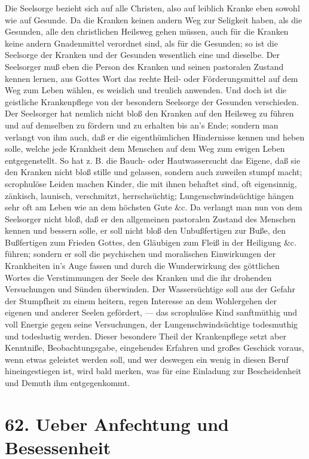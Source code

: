 Die Seelsorge bezieht sich auf alle Christen, also auf leiblich Kranke eben sowohl wie auf Gesunde. Da die Kranken keinen andern Weg zur Seligkeit haben, als die Gesunden, alle den christlichen Heilsweg gehen müssen, auch für die Kranken keine andern Gnadenmittel verordnet sind, als für die Gesunden; so ist die Seelsorge der Kranken und der Gesunden wesentlich eine und dieselbe. Der Seelsorger muß eben die Person des Kranken und seinen pastoralen Zustand kennen lernen, aus Gottes Wort das rechte Heil- oder Förderungsmittel auf dem Weg zum Leben wählen, es weislich und treulich anwenden. Und doch ist die geistliche Krankenpflege von der besondern Seelsorge der Gesunden verschieden. Der Seelsorger hat nemlich nicht bloß den Kranken auf den Heilsweg zu führen und auf demselben zu fördern und zu erhalten bis an’s Ende; sondern man verlangt von ihm auch, daß er die eigenthümlichen Hindernisse kennen und heben solle, welche jede Krankheit dem Menschen auf dem Weg zum ewigen Leben entgegenstellt. So hat z. B. die Bauch- oder Hautwassersucht das Eigene, daß sie den Kranken nicht bloß stille und gelassen, sondern auch zuweilen stumpf macht; scrophulöse Leiden machen Kinder, die mit ihnen behaftet sind, oft eigensinnig, zänkisch, launisch, verschmitzt, herrschsüchtig; Lungenschwindsüchtige hängen sehr oft am
Leben wie an dem höchsten Gute \&c. Da verlangt man nun von dem Seelsorger nicht bloß, daß er den allgemeinen pastoralen Zustand des Menschen kennen und bessern solle, er soll nicht bloß den Unbußfertigen zur Buße, den Bußfertigen zum Frieden Gottes, den Gläubigen zum Fleiß in der Heiligung \&c. führen; sondern er soll die psychischen und moralischen Einwirkungen der Krankheiten in’s Auge fassen und durch die Wunderwirkung des göttlichen Wortes die Verstimmungen der Seele des Kranken und die ihr drohenden Versuchungen und Sünden überwinden. Der Wassersüchtige soll aus der Gefahr der Stumpfheit zu einem heitern, regen Interesse an dem Wohlergehen der eigenen und anderer Seelen gefördert, — das scrophulöse Kind sanftmüthig und voll Energie gegen seine Versuchungen, der Lungenschwindsüchtige todesmuthig und todeslustig werden. Dieser besondere Theil der Krankenpflege setzt aber Kenntniße, Beobachtungsgabe, eingehendes Erfahren und großes Geschick voraus, wenn etwas geleistet werden soll, und wer deswegen ein wenig in diesen Beruf hineingestiegen ist, wird bald merken, was für eine Einladung zur Bescheidenheit und Demuth ihm entgegenkommt.

\section{62. Ueber Anfechtung und Besessenheit}

